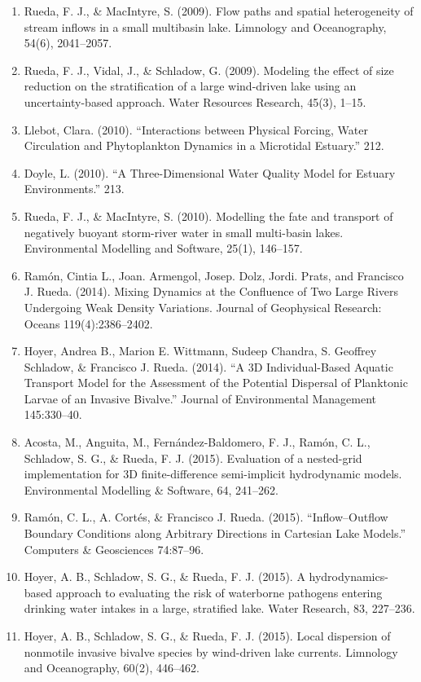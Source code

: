 \begin{enumerate}
    \item Rueda, F. J., \& MacIntyre, S. (2009). Flow paths and spatial heterogeneity of stream inflows in a small multibasin lake. Limnology and Oceanography, 54(6), 2041–2057.
    \item Rueda, F. J., Vidal, J., \& Schladow, G. (2009). Modeling the effect of size reduction on the stratification of a large wind-driven lake using an uncertainty-based approach. Water Resources Research, 45(3), 1–15.
    \item Llebot, Clara. (2010). “Interactions between Physical Forcing, Water Circulation and Phytoplankton Dynamics in a Microtidal Estuary.” 212.
    \item Doyle, L. (2010). “A Three-Dimensional Water Quality Model for Estuary Environments.” 213.
    \item Rueda, F. J., \& MacIntyre, S. (2010). Modelling the fate and transport of negatively buoyant storm-river water in small multi-basin lakes. Environmental Modelling and Software, 25(1), 146–157.
    \item Ramón, Cintia L., Joan. Armengol, Josep. Dolz, Jordi. Prats, and Francisco J. Rueda. (2014). Mixing Dynamics at the Confluence of Two Large Rivers Undergoing Weak Density Variations. Journal of Geophysical Research: Oceans 119(4):2386–2402.
    \item Hoyer, Andrea B., Marion E. Wittmann, Sudeep Chandra, S. Geoffrey Schladow, \& Francisco J. Rueda. (2014). “A 3D Individual-Based Aquatic Transport Model for the Assessment of the Potential Dispersal of Planktonic Larvae of an Invasive Bivalve.” Journal of Environmental Management 145:330–40.
    \item Acosta, M., Anguita, M., Fernández-Baldomero, F. J., Ramón, C. L., Schladow, S. G., \& Rueda, F. J. (2015). Evaluation of a nested-grid implementation for 3D finite-difference semi-implicit hydrodynamic models. Environmental Modelling \& Software, 64, 241–262.
    \item Ramón, C. L., A. Cortés, \& Francisco J. Rueda. (2015). “Inflow–Outflow Boundary Conditions along Arbitrary Directions in Cartesian Lake Models.” Computers \& Geosciences 74:87–96.
    \item Hoyer, A. B., Schladow, S. G., \& Rueda, F. J. (2015). A hydrodynamics-based approach to evaluating the risk of waterborne pathogens entering drinking water intakes in a large, stratified lake. Water Research, 83, 227–236.
    \item Hoyer, A. B., Schladow, S. G., \& Rueda, F. J. (2015). Local dispersion of nonmotile invasive bivalve species by wind-driven lake currents. Limnology and Oceanography, 60(2), 446–462.

\end{enumerate}

